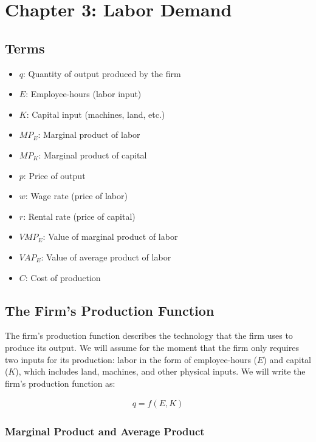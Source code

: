 \section{Chapter 3: Labor Demand}

\subsection{Terms}

\begin{itemize}
    \item $q$: Quantity of output produced by the firm
    \item $E$: Employee-hours (labor input)
    \item $K$: Capital input (machines, land, etc.)
    \item $MP_E$: Marginal product of labor
    \item $MP_K$: Marginal product of capital
    \item $p$: Price of output
    \item $w$: Wage rate (price of labor)
    \item $r$: Rental rate (price of capital)
    \item $VMP_E$: Value of marginal product of labor
    \item $VAP_E$: Value of average product of labor
    \item $C$: Cost of production
\end{itemize}

\subsection{The Firm's Production Function}

The firm's production function 
describes the technology that the firm 
uses to produce its output.
We will assume for the moment that 
the firm only requires two inputs for 
its production: labor in the form of 
employee-hours ($E$) and capital ($K$),
which includes land, machines, 
and other physical inputs.
We will write the firm's production function as:

\begin{align}
    q=f(E, K)
\end{align}

\subsubsection{Marginal Product and Average Product}

